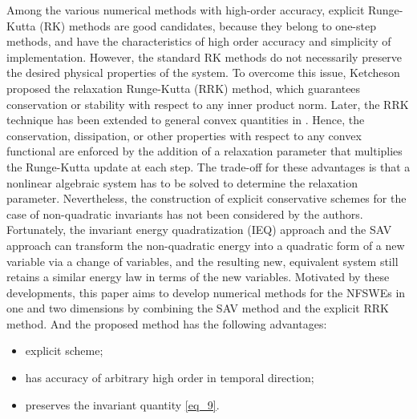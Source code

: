 \documentclass[preprint,compress,3p,10pt,fleqn]{elsarticle}
\numberwithin{equation}{section}
\begin{document}
Among the various numerical methods with high-order accuracy, explicit Runge-Kutta (RK) methods are good candidates,
because they belong to one-step methods, and have the characteristics of high
order accuracy and simplicity of implementation. However, the standard RK methods do not
necessarily preserve the desired physical properties of the system.  To overcome this issue,
Ketcheson \cite{ketchesonRelaxationRungeKutta2019} proposed the relaxation Runge-Kutta (RRK)
method, which guarantees conservation or stability with respect to any inner product norm.
Later, the RRK technique has been extended to general convex quantities in
\cite{ranochaRelaxationRungeKutta2020}. Hence, the conservation, dissipation, or other properties
with respect to any convex functional are enforced by the addition of a relaxation parameter
that multiplies the Runge-Kutta update at each step. The trade-off for these advantages is
that a nonlinear algebraic system has to be solved to determine the relaxation parameter.
Nevertheless, the construction of explicit conservative schemes for the case of non-quadratic
invariants has not been considered by the authors. Fortunately, the invariant energy
quadratization (IEQ) approach \cite{yangLinearUnconditionallyEnergy2017, yangEfficientLinearSchemes2017}
and the SAV approach \cite{chengConvergenceEnergyconservingScheme2022}
can transform the non-quadratic energy into a quadratic form of a new variable via a change of
variables, and the resulting new, equivalent system still retains a similar energy law in terms
of the new variables.
Motivated by these developments, this paper aims to develop numerical methods for the NFSWEs in one and two dimensions by combining the SAV method and the explicit RRK method.
And the proposed method has the following advantages:
\begin{itemize}
	\item explicit scheme;
	\item has accuracy of arbitrary high order in temporal direction;
	\item preserves the invariant quantity \eqref{eq_9}.
\end{itemize}

\end{document}
